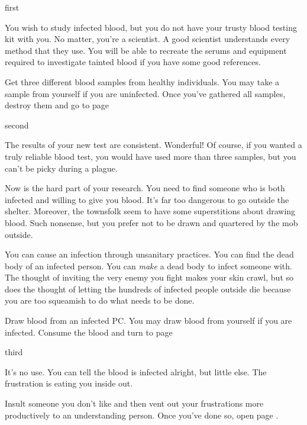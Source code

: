 \documentclass[greennotebook]{Pestilence} %
\begin{document}
\startnotebook{\nOutsiderLab{}}

\begin{page}{first}

You wish to study infected blood, but you do not have your trusty blood testing kit with you. No matter, you're a scientist. A good scientist understands every method that they use. You will be able to recreate the serums and equipment required to investigate tainted blood if you have some good references.

Get three different blood samples from healthy individuals. You may take a sample from yourself if you are uninfected. Once you've gathered all samples, destroy them and go to page 

\end{page}

\begin{page}{second}

The results of your new test are consistent. Wonderful! Of course, if you wanted a truly reliable blood test, you would have used more than three samples, but you can't be picky during a plague. 

Now is the hard part of your research. You need to find someone who is both infected and willing to give you blood. It's far too dangerous to go outside the shelter. Moreover, the townsfolk seem to have some superstitions about drawing blood. Such nonsense, but you prefer not to be drawn and quartered by the mob outside.

You can cause an infection through unsanitary practices. You can find the dead body of an infected person. You can \textit{make} a dead body to infect someone with. The thought of inviting the very enemy you fight makes your skin crawl, but so does the thought of letting the hundreds of infected people outside die because you are too squeamish to do what needs to be done.

Draw blood from an infected PC. You may draw blood from yourself if you are infected. Consume the blood and turn to page 

\end{page}

\begin{page}{third}

It's no use. You can tell the blood is infected alright, but little else. The frustration is eating you inside out.

Insult someone you don't like and then vent out your frustrations more productively to an understanding person. Once you've done so, open page .

\end{page}
\end{document}
